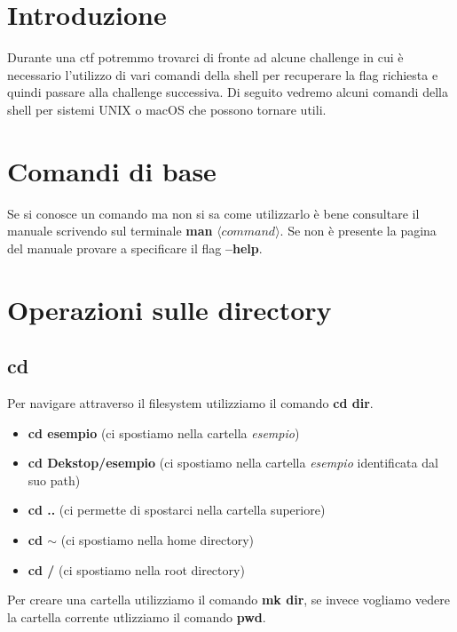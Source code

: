 \documentclass[oneside,a4paper,11pt]{book}
\theoremstyle{italicstyle}
\theoremstyle{normStyle}
\begin{document}
\section{Introduzione}
Durante una ctf potremmo trovarci di fronte ad alcune challenge in cui è necessario l'utilizzo di vari comandi della shell per recuperare la flag richiesta e quindi passare alla challenge successiva.
Di seguito vedremo alcuni comandi della shell per sistemi UNIX o macOS che possono tornare utili.

\section{Comandi di base}
Se si conosce un comando ma non si sa come utilizzarlo è bene consultare il manuale scrivendo sul terminale \textbf{man} $\langle command \rangle$. Se non è presente la pagina del manuale provare a specificare il flag \textbf{--help}. 

\section{Operazioni sulle directory}
\subsection{cd}
Per navigare attraverso il filesystem utilizziamo il comando \textbf{cd dir}.
\begin{itemize}
    \item \textbf{cd esempio} (ci spostiamo nella cartella \textit{esempio})
    \item \textbf{cd Dekstop/esempio} (ci spostiamo nella cartella \textit{esempio} identificata dal suo path)
    \item \textbf{cd ..} (ci permette di spostarci nella cartella superiore)
    \item \textbf{cd $\sim$} (ci spostiamo nella home directory)
    \item \textbf{cd /} (ci spostiamo nella root directory)
\end{itemize}
Per creare una cartella utilizziamo il comando \textbf{mk dir}, se invece vogliamo vedere la cartella corrente utlizziamo il comando \textbf{pwd}.
\end{document}
